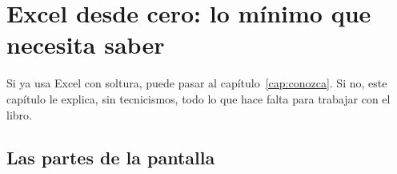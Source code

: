 \chapter{Excel desde cero: lo mínimo que necesita saber}\label{cap:excel}

Si ya usa Excel con soltura, puede pasar al capítulo~\ref{cap:conozca}. Si no, este capítulo le explica, sin tecnicismos,
todo lo que hace falta para trabajar con el libro.

\section{Las partes de la pantalla}

